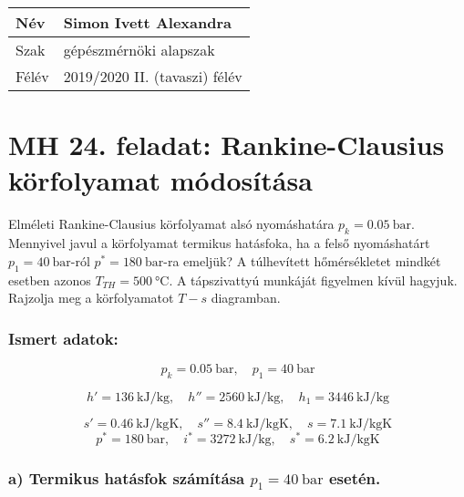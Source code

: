 
\begin{tabular}{ | p{2cm} | p{14cm} | } 
	\hline
	Név & Simon Ivett Alexandra \\ 
	\hline
	Szak & gépészmérnöki alapszak \\ 
	\hline
	Félév & 2019/2020 II. (tavaszi) félév \\ 
	\hline
\end{tabular}


\section*{MH 24. feladat: Rankine-Clausius körfolyamat módosítása}

Elméleti Rankine-Clausius körfolyamat alsó nyomáshatára $p_k = \SI{0,05}{\bar}$. Mennyivel javul a körfolyamat termikus hatásfoka, ha a felső nyomáshatárt $p_1 = \SI{40}{\bar}$-ról $p^* = \SI{180}{\bar}$-ra emeljük? A túlhevített hőmérsékletet mindkét esetben azonos $T_{TH} = \SI{500}{\celsius}$. A tápszivattyú munkáját figyelmen kívül hagyjuk. Rajzolja meg a körfolyamatot $T-s$ diagramban.

\subsubsection{Ismert adatok:}

\begin{equation*}
	p_k = \SI{0,05}{\bar},
	\quad
	p_1 = \SI{40}{\bar}	
\end{equation*}

\begin{equation*}
	h' = \SI{136}{\kilo\joule\per\kilogram},
	\quad
	h'' = \SI{2560}{\kilo\joule\per\kilogram},
	\quad
	h_1 = \SI{3446}{\kilo\joule\per\kilogram}
\end{equation*}

\begin{equation*}
	s' = \SI{0,46}{\kilo\joule\per\kilogram\kelvin},
	\quad
	s'' = \SI{8,4}{\kilo\joule\per\kilogram\kelvin},
	\quad
	s = \SI{7,1}{\kilo\joule\per\kilogram\kelvin}
\end{equation*}
\begin{equation*}
	p^* = \SI{180}{\bar},
	\quad
	i^* = \SI{3272}{\kilo\joule\per\kilogram},
	\quad
	s^* = \SI{6,2}{\kilo\joule\per\kilogram\kelvin}
\end{equation*}


\subsubsection*{a) Termikus hatásfok számítása $p_1=\SI{40}{\bar}$ esetén.}

